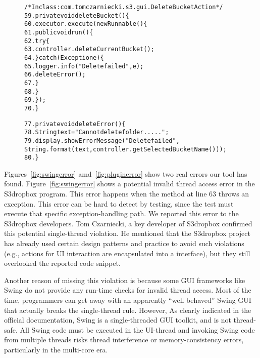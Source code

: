 \begin{figure}[t]
\begin{CodeOut}
\begin{alltt}
/* In class: com.tomczarniecki.s3.gui.DeleteBucketAction */
59.private void deleteBucket() \{
60.    executor.execute(new Runnable() \{
61.        public void run() \{
62.            try \{
63.                controller.deleteCurrentBucket();
64.            \} catch (Exception e) \{
65.                logger.info("Delete failed", e);
66.                deleteError(); 
67.            \}
68.       \}
69.    \});
70.\}

77.private void deleteError() \{
78.    String text = "Cannot delete folder .....";
79.    display.showErrorMessage("Delete failed", 
        String.format(text, controller.getSelectedBucketName())); 
80.\}
\end{alltt}
\end{CodeOut}
\vspace*{-2.0ex}  %
\end{figure}

Figures~\ref{fig:swingerror} amd~\ref{fig:pluginerror} show
two real errors our tool has found. Figure~\ref{fig:swingerror}
shows a potential invalid thread access error in the S3dropbox
program. This error happens when the 
method at line 63 throws an exception. This error can be hard to
detect by testing, since the test must  execute that specific exception-handling
path. We reported this error to the S3dropbox developers. Tom Czarniecki,
a key developer of S3dropbox confirmed this potential single-thread
violation. He mentioned that the S3dropbox project has already
used certain design patterns and practice to avoid such violations (e.g.,
actions for UI interaction are encapsulated into a  interface),
but they still overlooked  the reported code snippet. 

Another reason of missing this violation is because some GUI frameworks like Swing
do not provide any run-time checks for invalid thread access. Most
of the time, programmers can get away with an apparently ``well behaved'' Swing
GUI that actually breaks the single-thread rule. However, As clearly
indicated in the official documentation, Swing is a single-threaded GUI
toolkit, and is not thread-safe. All Swing code must be executed in the UI-thread and
invoking Swing code from multiple threads risks thread interference
or memory-consistency errors, particularly in the multi-core era.




